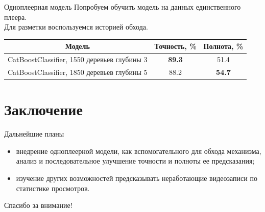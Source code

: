 \documentclass{beamer}
\begin{document}
\begin{frame}{Одноплеерная модель}
    Попробуем обучить модель на данных единственного плеера. \\
    Для разметки воспользуемся историей обхода.
    \begin{table}
        \centering
        \begin{tabular}{|c|c|c|}
            \hline
            Модель & Точность, \% & Полнота, \% \\
            \hline
            CatBoostClassifier, 1550 деревьев глубины 3 & \textbf{89.3} & 51.4 \\
            \hline
            CatBoostClassifier, 1850 деревьев глубины 5 & 88.2 & \textbf{54.7} \\
            \hline
        \end{tabular}
    \end{table}
\end{frame}

\section{Заключение}

\begin{frame}{Дальнейшие планы}
    \begin{itemize}
        \item внедрение одноплеерной модели, как вспомогательного для обхода механизма, анализ и последовательное улучшение точности и полноты ее предсказания;
        \item изучение других возможностей предсказывать неработающие видеозаписи по статистике просмотров.
    \end{itemize}
\end{frame}

\begin{frame}
    \begin{center}
        \Large Спасибо за внимание!
    \end{center}
\end{frame}
\end{document}
